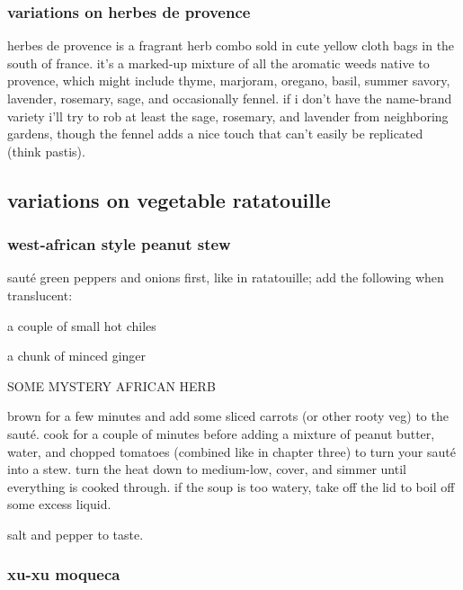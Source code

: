 \subsubsection{variations on herbes de provence}

herbes de provence is a fragrant herb combo sold in cute yellow cloth bags in 
the south of france. it's a marked-up mixture of all the aromatic weeds native 
to provence, which might include thyme, marjoram, oregano, basil, summer 
savory, lavender, rosemary, sage, and occasionally fennel. if i don't have the 
name-brand variety i'll try to rob at least the sage, rosemary, and lavender 
from neighboring gardens, though the fennel adds a nice touch that can't 
easily be replicated (think pastis).


\subsection{variations on vegetable ratatouille}

\subsubsection{west-african style peanut stew}

saut\'{e} green peppers and onions first, like in ratatouille; add the 
following when translucent:

\begin{ingredients}
  \item a couple of small hot chiles
  \item a chunk of minced ginger
  \item SOME MYSTERY AFRICAN HERB
\end{ingredients}
	
brown for a few minutes and add some sliced carrots (or other rooty veg) to 
the saut\'{e}. cook for a couple of minutes before adding a mixture of peanut 
butter, water, and chopped tomatoes (combined like in chapter three) to turn 
your saut\'{e} into a stew. turn the heat down to medium-low, cover, and 
simmer until everything is cooked through. if the soup is too watery, take off 
the lid to boil off some excess liquid.

salt and pepper to taste.

\subsubsection{xu-xu moqueca}

